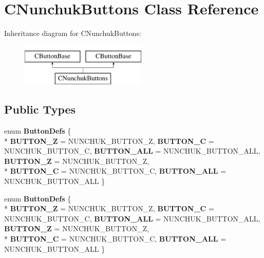 \hypertarget{class_c_nunchuk_buttons}{\section{C\-Nunchuk\-Buttons Class Reference}
\label{class_c_nunchuk_buttons}
}
Inheritance diagram for C\-Nunchuk\-Buttons\-:\begin{figure}[H]
\begin{center}
\leavevmode
\includegraphics[height=2.000000cm]{class_c_nunchuk_buttons}
\end{center}
\end{figure}
\subsection*{Public Types}
\begin{DoxyCompactItemize}
\item 
enum {\bfseries Button\-Defs} \{ \\*
{\bfseries B\-U\-T\-T\-O\-N\-\_\-\-Z} =  N\-U\-N\-C\-H\-U\-K\-\_\-\-B\-U\-T\-T\-O\-N\-\_\-\-Z, 
{\bfseries B\-U\-T\-T\-O\-N\-\_\-\-C} =  N\-U\-N\-C\-H\-U\-K\-\_\-\-B\-U\-T\-T\-O\-N\-\_\-\-C, 
{\bfseries B\-U\-T\-T\-O\-N\-\_\-\-A\-L\-L} =  N\-U\-N\-C\-H\-U\-K\-\_\-\-B\-U\-T\-T\-O\-N\-\_\-\-A\-L\-L, 
{\bfseries B\-U\-T\-T\-O\-N\-\_\-\-Z} =  N\-U\-N\-C\-H\-U\-K\-\_\-\-B\-U\-T\-T\-O\-N\-\_\-\-Z, 
\\*
{\bfseries B\-U\-T\-T\-O\-N\-\_\-\-C} =  N\-U\-N\-C\-H\-U\-K\-\_\-\-B\-U\-T\-T\-O\-N\-\_\-\-C, 
{\bfseries B\-U\-T\-T\-O\-N\-\_\-\-A\-L\-L} =  N\-U\-N\-C\-H\-U\-K\-\_\-\-B\-U\-T\-T\-O\-N\-\_\-\-A\-L\-L
 \}
\item 
enum {\bfseries Button\-Defs} \{ \\*
{\bfseries B\-U\-T\-T\-O\-N\-\_\-\-Z} =  N\-U\-N\-C\-H\-U\-K\-\_\-\-B\-U\-T\-T\-O\-N\-\_\-\-Z, 
{\bfseries B\-U\-T\-T\-O\-N\-\_\-\-C} =  N\-U\-N\-C\-H\-U\-K\-\_\-\-B\-U\-T\-T\-O\-N\-\_\-\-C, 
{\bfseries B\-U\-T\-T\-O\-N\-\_\-\-A\-L\-L} =  N\-U\-N\-C\-H\-U\-K\-\_\-\-B\-U\-T\-T\-O\-N\-\_\-\-A\-L\-L, 
{\bfseries B\-U\-T\-T\-O\-N\-\_\-\-Z} =  N\-U\-N\-C\-H\-U\-K\-\_\-\-B\-U\-T\-T\-O\-N\-\_\-\-Z, 
\\*
{\bfseries B\-U\-T\-T\-O\-N\-\_\-\-C} =  N\-U\-N\-C\-H\-U\-K\-\_\-\-B\-U\-T\-T\-O\-N\-\_\-\-C, 
{\bfseries B\-U\-T\-T\-O\-N\-\_\-\-A\-L\-L} =  N\-U\-N\-C\-H\-U\-K\-\_\-\-B\-U\-T\-T\-O\-N\-\_\-\-A\-L\-L
 \}
\end{DoxyCompactItemize}
